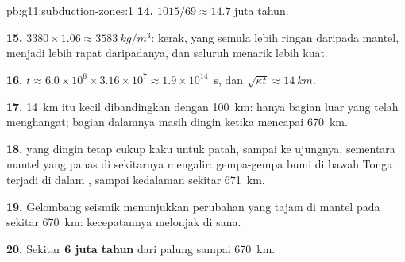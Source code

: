 \begin{solution}{pb:g11:subduction-zones:1}
\textbf{14.} $1015/69 \approx 14.7$ juta tahun.

\textbf{15.} $3380 \times 1.06 \approx \qty{3583}{kg/m^3}$: kerak, yang semula
lebih ringan daripada mantel, menjadi lebih rapat daripadanya, dan seluruh
 menarik lebih kuat.

\textbf{16.} $t \approx 6.0 \times 10^6 \times 3.16 \times 10^7 \approx
1.9 \times 10^{14}$~s, dan $\sqrt{\kappa t} \approx \qty{14}{km}$.

\textbf{17.} \qty{14}{km} itu kecil dibandingkan dengan \qty{100}{km}: hanya
bagian luar  yang telah menghangat; bagian dalamnya masih dingin ketika
mencapai \qty{670}{km}.

\textbf{18.}  yang dingin tetap cukup kaku untuk patah, sampai ke
ujungnya, sementara mantel yang panas di sekitarnya mengalir: gempa-gempa bumi di
bawah Tonga terjadi di dalam , sampai kedalaman sekitar \qty{671}{km}.

\textbf{19.} Gelombang seismik menunjukkan perubahan yang tajam di mantel pada
sekitar \qty{670}{km}: kecepatannya melonjak di sana.

\textbf{20.} Sekitar \textbf{6 juta tahun} dari palung sampai
\qty{670}{km}.
\end{solution}

